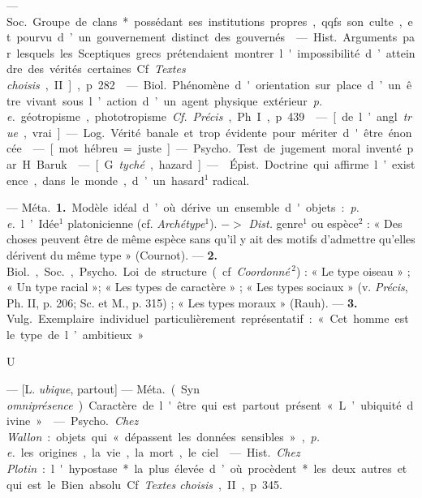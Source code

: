 \begin{itemize}[leftmargin=1cm, label=, itemsep=1pt]
 — \si{Soc.} Groupe de clans* possédant ses institutions propres,
qqfs. son culte, et pourvu d’un gouvernement distinct des gouvernés.

 — \si{Hist.} Arguments par lesquels les Sceptiques grecs
prétendaient montrer l'impossibilité d’atteindre des vérités certaines. Cf.
{\it Textes choisis}, II], p. 282.

 — \si{Biol.} Phénomène d'orientation sur place d’un être vivant
sous l’action d’un agent physique extérieur {\it p. e.} géotropisme,
phototropisme. {\it Cf.} {\it Précis}, Ph. I, p. 439.

 — [de l’angl. {\it true}, vrai] — \si{Log.} Vérité banale et
trop évidente pour mériter d'être énoncée.

 — [mot hébreu = juste] — \si{Psycho.} Test de jugement moral
inventé par H. Baruk.

 — [G. {\it tyché}, hazard] —  \si{Épist.}
Doctrine qui affirme l’existence, dans le monde, d’un hasard$^1$ radical.

 — \si{Méta.} {\bf 1.} Modèle idéal d’où dérive un ensemble
d'objets : {\it p. e.} l’Idée$^1$ platonicienne (cf. {\it Archétype}$^1$).
$->$ {\it Dist.} genre$^1$ ou espèce$^2$ : « Des choses peuvent être de même
espèce sans qu'il y ait des motifs d'admettre qu'elles dérivent du même type
» (Cournot). — {\bf 2.} \si{Biol.}, \si{Soc.}, \si{Psycho.} Loi de structure
(cf. {\it Coordonné}$\,^2$) : « Le type oiseau » ; « Un type racial »; « Les
types de caractère » ; « Les types sociaux » (v. {\it Précis}, Ph. II, p. 206;
Sc. et M., p. 315) ; « Les types moraux » (Rauh). —  {\bf 3.} \si{Vulg.}
Exemplaire individuel particulièrement représentatif : « Cet homme est le
type de l’ambitieux. »

\begin{center}
\huge{U}
\end{center}

 — [L. {\it ubique}, partout] — \si{Méta.} (Syn. {\it
omniprésence}). Caractère de l'être qui est partout présent « L’ubiquité
divine. »

 — \si{Psycho.} {\it Chez Wallon} : objets qui « dépassent
les données sensibles », {\it p. e.} les origines, la vie, la mort, le ciel.

 — \si{Hist.} {\it Chez Plotin} : l'hypostase* la plus élevée
d’où procèdent* les deux autres et qui est le Bien absolu. Cf. {\it Textes
choisis}, II, p. 345.


\end{itemize}
